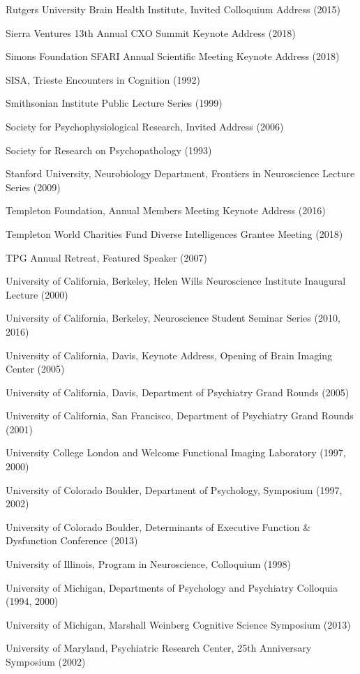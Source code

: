 \documentclass[10 pt]{article}
\begin{document}
Rutgers University Brain Health Institute, Invited Colloquium Address (2015)

Sierra Ventures 13th Annual CXO Summit Keynote Address (2018)

Simons Foundation SFARI Annual Scientific Meeting Keynote Address (2018)

SISA, Trieste Encounters in Cognition (1992)

Smithsonian Institute Public Lecture Series (1999)

Society for Psychophysiological Research, Invited Address (2006)

Society for Research on Psychopathology (1993)

Stanford University, Neurobiology Department, Frontiers in Neuroscience Lecture Series (2009)

Templeton Foundation, Annual Members Meeting Keynote Address (2016)

Templeton World Charities Fund Diverse Intelligences Grantee Meeting (2018)

TPG Annual Retreat, Featured Speaker (2007)

University of California, Berkeley, Helen Wills Neuroscience Institute Inaugural Lecture (2000)

University of California, Berkeley, Neuroscience Student Seminar Series (2010, 2016)

University of California, Davis, Keynote Address, Opening of Brain Imaging Center (2005)

University of California, Davis, Department of Psychiatry Grand Rounds (2005)

University of California, San Francisco, Department of Psychiatry Grand Rounds (2001)

University College London and Welcome Functional Imaging Laboratory (1997, 2000)

University of Colorado Boulder, Department of Psychology, Symposium (1997, 2002)

University of Colorado Boulder, Determinants of Executive Function \& Dysfunction Conference (2013)

University of Illinois, Program in Neuroscience, Colloquium (1998)

University of Michigan, Departments of Psychology and Psychiatry Colloquia (1994, 2000)

University of Michigan, Marshall Weinberg Cognitive Science Symposium (2013)

University of Maryland, Psychiatric Research Center, 25th Anniversary Symposium (2002)
\end{document}
